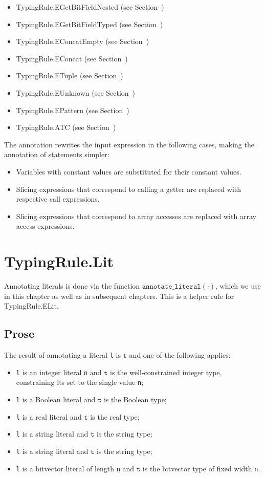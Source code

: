 \documentclass{book}
\newcommand\annotateliteral[1]{\texttt{annotate\_literal}(#1)}
\newcommand\vt[0]{\texttt{t}}
\begin{document}
\begin{itemize}
\begin{itemize}
\item TypingRule.EGetBitFieldNested (see Section~)
\item TypingRule.EGetBitFieldTyped (see Section~)
\item TypingRule.EConcatEmpty (see Section~)
\item TypingRule.EConcat (see Section~)
\item TypingRule.ETuple (see Section~)
\item TypingRule.EUnknown (see Section~)
\item TypingRule.EPattern (see Section~)
\item TypingRule.ATC (see Section~)
\end{itemize}

The annotation rewrites the input expression in the following cases, making the annotation of statements simpler:
\begin{itemize}
  \item Variables with constant values are substituted for their constant values.
  \item Slicing expressions that correspond to calling a getter are replaced with respective call expressions.
  \item Slicing expressions that correspond to array accesses are replaced with array access expressions.
\end{itemize}

\section{TypingRule.Lit \label{sec:TypingRule.Lit}}

Annotating literals is done via the function $\annotateliteral{\cdot}$,
which we use in this chapter as well as in subsequent chapters.
This is a helper rule for TypingRule.ELit.
\subsection{Prose}
The result of annotating a literal \texttt{l} is $\vt$ and one of the following applies:
\begin{itemize}
\item \texttt{l} is an integer literal \texttt{n} and $\vt$ is the well-constrained integer type, constraining
its set to the single value \texttt{n};
\item \texttt{l} is a Boolean literal and $\vt$ is the Boolean type;
\item \texttt{l} is a real literal and $\vt$ is the real type;
\item \texttt{l} is a string literal and $\vt$ is the string type;
\item \texttt{l} is a string literal and $\vt$ is the string type;
\item \texttt{l} is a bitvector literal of length \texttt{n} and $\vt$ is the bitvector type of fixed width \texttt{n}.
\end{itemize}


\end{itemize}
\end{document}
